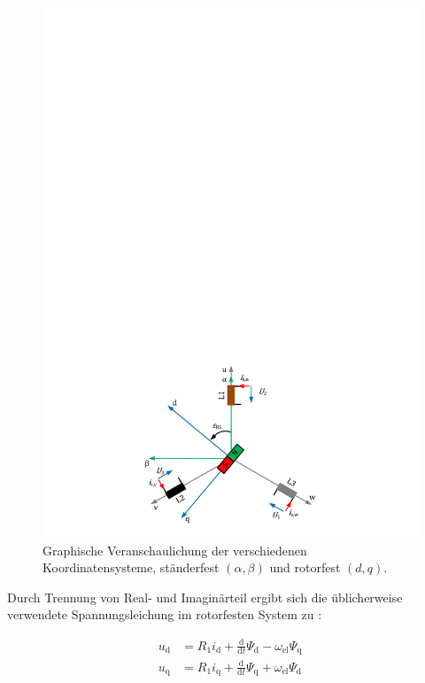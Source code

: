 \documentclass[conference,twocolumn]{IEEEtran}
\newcommand{\shortpage}{\enlargethispage{-\baselineskip}}
\newcommand{\x}[1]{\mathrm{#1}}
\begin{document}
\begin{figure}[h!]
\centering
\includegraphics[width=\columnwidth]{img/synchron-grundlage}
\caption{Graphische Veranschaulichung der verschiedenen Koordinatensysteme, ständerfest $(\alpha, \beta)$ und rotorfest $(d, q)$.}
\label{fig:synchron-grundlage}
\end{figure}

\shortpage

Durch Trennung von Real- und Imaginärteil ergibt sich die üblicherweise verwendete Spannungsleichung im rotorfesten System zu \autocites{schroder2001}{nuss2010}:

\begin{align}
u_\x{d} &= R_\x{1} i_\x{d} + \frac{\x{d}}{\x{d}t}\Psi_\x{d} - \omega_{\x{el}} \Psi_\x{q} \label{eqn:ud} \\ 
u_\x{q} &= R_\x{1} i_\x{q} + \frac{\x{d}}{\x{d}t}\Psi_\x{q} + \omega_{\x{el}} \Psi_\x{d} \label{eqn:uq}
\end{align}
\end{document}
